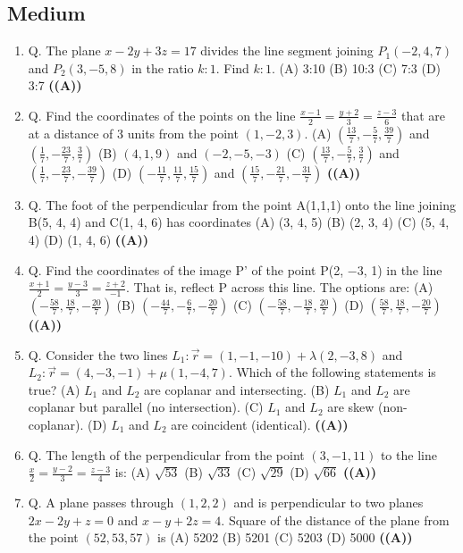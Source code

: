 \documentclass{article}
\begin{document}
\subsection{Medium}
\begin{enumerate}
\item Q. The plane $x - 2y + 3z = 17$ divides the line segment joining $P_1(-2, 4, 7)$ and $P_2(3, -5, 8)$ in the ratio $k:1$. Find $k:1$.
(A) 3:10
(B) 10:3
(C) 7:3
(D) 3:7 \hfill \textbf{((A))}
\item Q. Find the coordinates of the points on the line $\frac{x-1}{2} = \frac{y+2}{3} = \frac{z-3}{6}$ that are at a distance of 3 units from the point $(1, -2, 3)$.
(A) $(\frac{13}{7}, -\frac{5}{7}, \frac{39}{7})$ and $(\frac{1}{7}, -\frac{23}{7}, \frac{3}{7})$
(B) $(4,1,9)$ and $(-2, -5, -3)$
(C) $(\frac{13}{7}, -\frac{5}{7}, \frac{3}{7})$ and $(\frac{1}{7}, -\frac{23}{7}, -\frac{39}{7})$
(D) $(-\frac{11}{7}, \frac{11}{7}, \frac{15}{7})$ and $(\frac{15}{7}, -\frac{21}{7}, -\frac{31}{7})$ \hfill \textbf{((A))}
\item Q. The foot of the perpendicular from the point A(1,1,1) onto the line joining B(5, 4, 4) and C(1, 4, 6) has coordinates
(A) (3, 4, 5)
(B) (2, 3, 4)
(C) (5, 4, 4)
(D) (1, 4, 6) \hfill \textbf{((A))}
\item Q. Find the coordinates of the image P' of the point P(2, −3, 1) in the line $\frac{x+1}{2} = \frac{y-3}{3} = \frac{z+2}{-1}$. That is, reflect P across this line. The options are:
(A) $(-\frac{58}{7}, \frac{18}{7}, -\frac{20}{7})$
(B) $(-\frac{44}{7}, -\frac{6}{7}, -\frac{20}{7})$
(C) $(-\frac{58}{7}, -\frac{18}{7}, \frac{20}{7})$
(D) $(\frac{58}{7}, \frac{18}{7}, -\frac{20}{7})$ \hfill \textbf{((A))}
\item Q. Consider the two lines $L_1 : \vec{r} = (1, -1, -10) + \lambda (2, -3, 8)$ and $L_2 : \vec{r} = (4, -3, -1) + \mu (1, -4, 7)$. Which of the following statements is true?
(A) $L_1$ and $L_2$ are coplanar and intersecting.
(B) $L_1$ and $L_2$ are coplanar but parallel (no intersection).
(C) $L_1$ and $L_2$ are skew (non-coplanar).
(D) $L_1$ and $L_2$ are coincident (identical). \hfill \textbf{((A))}
\item Q. The length of the perpendicular from the point $(3, -1, 11)$ to the line $\frac{x}{2} = \frac{y-2}{3} = \frac{z-3}{4}$ is:
(A) $\sqrt{53}$
(B) $\sqrt{33}$
(C) $\sqrt{29}$
(D) $\sqrt{66}$ \hfill \textbf{((A))}
\item Q. A plane passes through $(1, 2, 2)$ and is perpendicular to two planes $2x - 2y + z = 0$ and $x - y + 2z = 4$. Square of the distance of the plane from the point $(52, 53, 57)$ is
(A) 5202
(B) 5201
(C) 5203
(D) 5000 \hfill \textbf{((A))}
\end{enumerate}
\end{document}
